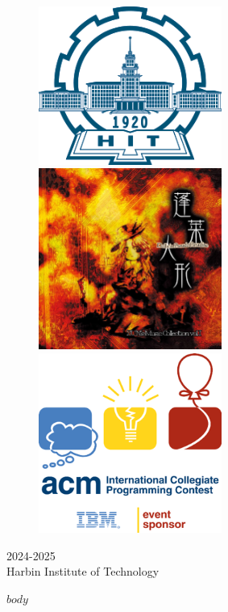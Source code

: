 \documentclass[10pt]{ctexart}
\def\university{Harbin Institute of Technology}
\def\season{2024-2025}
\begin{document}
\begin{titlepage}
    \begin{figure}[htbp]
        \centering
        \begin{minipage}[c]{0.25\textwidth}
            \centering
            \includegraphics[width=6cm]{utils/images/hit-logo.png}
        \end{minipage}
        \hspace{1cm}
        \begin{minipage}[c]{0.25\textwidth}
            \centering
            \includegraphics[width=6cm]{utils/images/hourai.jpg}
        \end{minipage}
        \hspace{1cm}
        \begin{minipage}[c]{0.25\textwidth}
            \centering
            \includegraphics[width=6cm]{utils/images/icpc.png}
        \end{minipage}
    \end{figure}

    \vfill

    \begin{center}
        \Large \color{darkgray} \season \\
        \Large \color{darkgray} \university
    \end{center}

    \vspace*{1cm}
\end{titlepage}

\newpage

\begin{multicols}{3}
    \setcounter{page}{1}

    \tableofcontents
    
    $body$
\end{multicols}
\end{document}
